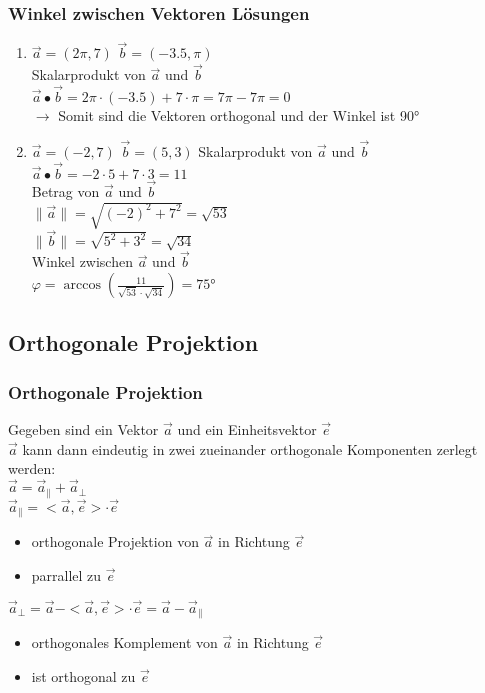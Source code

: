 \begin{frame}
    \frametitle{Winkel zwischen Vektoren Lösungen}
    \begin{enumerate}
        \item $\vec{a} = (2\pi, 7)$ $\vec{b} = (-3.5, \pi)$ \\
        Skalarprodukt von $\vec{a}$ und $\vec{b}$ \\
        $\vec{a} \bullet \vec{b} = 2\pi \cdot (-3.5) + 7 \cdot \pi = 7\pi - 7\pi = 0$ \\
        $\rightarrow$ Somit sind die Vektoren orthogonal und der Winkel ist 90° \\
        $ $ \\
        \item $\vec{a} = (-2, 7)$ $\vec{b} = (5, 3)$
        Skalarprodukt von $\vec{a}$ und $\vec{b}$ \\
        $\vec{a} \bullet \vec{b} = -2 \cdot 5 + 7 \cdot 3 = 11$ \\
        Betrag von $\vec{a}$ und $\vec{b}$ \\
        $\lVert \vec{a} \rVert = \sqrt{(-2)^2 + 7^2} = \sqrt{53}$ \\
        $\lVert \vec{b} \rVert = \sqrt{5^2 + 3^2} = \sqrt{34}$ \\
        Winkel zwischen $\vec{a}$ und $\vec{b}$ \\
        $\varphi = \arccos(\frac{11}{\sqrt{53} \cdot \sqrt{34}}) = 75$°
    \end{enumerate}
\end{frame}

\subsection{Orthogonale Projektion}
\begin{frame}
    \frametitle{Orthogonale Projektion}
    Gegeben sind ein Vektor $\vec{a}$ und ein Einheitsvektor $\vec{e}$\\
    $\vec{a}$ kann dann eindeutig in zwei zueinander orthogonale Komponenten zerlegt werden:\\
    $\vec{a} = \vec{a}_{\parallel} + \vec{a}_{\perp}$ \\
    $ $\\
    $\vec{a}_{\parallel} = < \vec{a}, \vec{e}> \cdot \vec{e}$ \\
    \begin{itemize}
        \item orthogonale Projektion von $\vec{a}$ in Richtung $\vec{e}$
        \item parrallel zu $\vec{e}$
    \end{itemize}
    $\vec{a}_{\perp} = \vec{a} - <\vec{a}, \vec{e}> \cdot \vec{e} = \vec{a} - \vec{a}_{\parallel}$
    \begin{itemize}
        \item orthogonales Komplement von $\vec{a}$ in Richtung $\vec{e}$
        \item ist orthogonal zu $\vec{e}$
    \end{itemize}
\end{frame}

